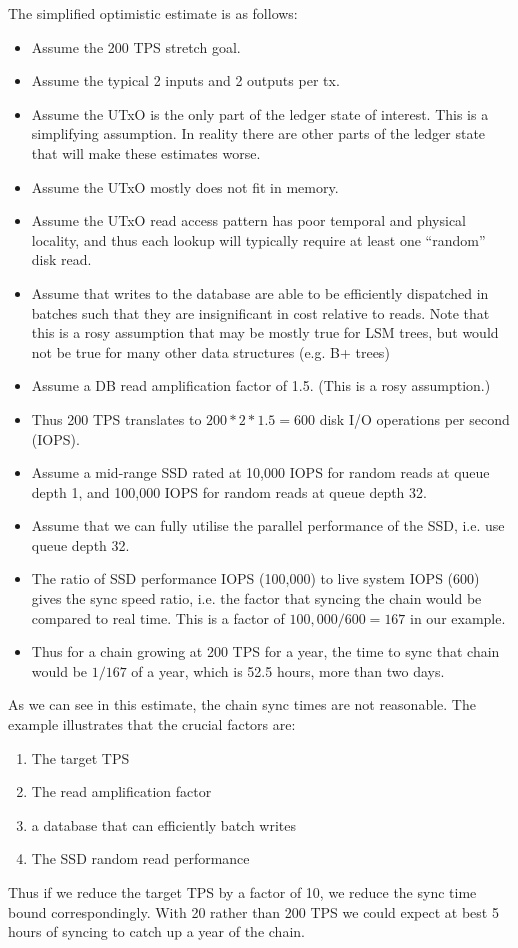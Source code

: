 \documentclass[11pt,a4paper]{article}
\begin{document}
The simplified optimistic estimate is as follows:
\begin{itemize}
\item Assume the 200 TPS stretch goal.
\item Assume the typical 2 inputs and 2 outputs per tx.
\item Assume the UTxO is the only part of the ledger state of interest. This is
      a simplifying assumption. In reality there are other parts of the ledger
      state that will make these estimates worse.
\item Assume the UTxO mostly does not fit in memory.
\item Assume the UTxO read access pattern has poor temporal and physical
      locality, and thus each lookup will typically require at least one
      ``random'' disk read.
\item Assume that writes to the database are able to be efficiently dispatched
        in batches such that they are insignificant in cost relative to reads.
        Note that this is a rosy assumption that may be mostly true for LSM trees,
        but would not be true for many other data structures (e.g. B+ trees)
\item Assume a DB read amplification factor of 1.5. (This is a rosy assumption.)
\item Thus 200 TPS translates to $200 * 2 * 1.5 = 600$ disk I/O operations per
      second (IOPS).
\item Assume a mid-range SSD rated at 10,000 IOPS for random reads at queue
      depth 1, and 100,000 IOPS for random reads at queue depth 32.
\item Assume that we can fully utilise the parallel performance of the SSD,
      i.e. use queue depth 32.
\item The ratio of SSD performance IOPS (100,000) to live system IOPS (600)
      gives the sync speed ratio, i.e. the factor that syncing the chain would
      be compared to real time. This is a factor of $100,000 / 600 = 167$ in
      our example.
\item Thus for a chain growing at 200 TPS for a year, the time to sync that
      chain would be $1/167$ of a year, which is 52.5 hours, more than two days.
\end{itemize}

As we can see in this estimate, the chain sync times are not reasonable.
The example illustrates that the crucial factors are:
\begin{enumerate}
\item The target TPS
\item The read amplification factor
\item a database that can efficiently batch writes
\item The SSD random read performance
\end{enumerate}
Thus if we reduce the target TPS by a factor of 10, we reduce the sync time bound
correspondingly. With 20 rather than 200 TPS we could expect at best 5 hours of syncing
to catch up a year of the chain.
\end{document}
